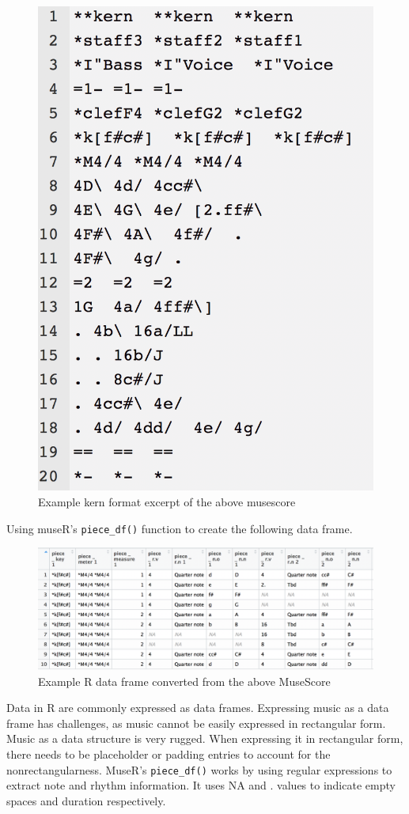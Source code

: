 \documentclass[12pt,twoside]{reedthesis}
\theoremstyle{definition}
\theoremstyle{definition}
\theoremstyle{definition}
\theoremstyle{remark}
\begin{document}
\begin{figure}[h]
\centering
\includegraphics[scale = .5]{images/ex1k.png}
\caption{Example kern format excerpt of the above musescore}
\label{subd}
\end{figure}
Using museR's \texttt{piece\_df()} function to create the following data
frame.
\begin{figure}[h]
\centering
\includegraphics[scale = .5]{images/ex1r.png}
\caption{Example R data frame converted from the above MuseScore}
\label{subd}
\end{figure}
Data in R are commonly expressed as data frames. Expressing music as a
data frame has challenges, as music cannot be easily expressed in
rectangular form. Music as a data structure is very rugged. When
expressing it in rectangular form, there needs to be placeholder or
padding entries to account for the nonrectangularness. MuseR's
\texttt{piece\_df()} works by using regular expressions to extract note
and rhythm information. It uses NA and . values to indicate empty spaces
and duration respectively.
\end{document}
